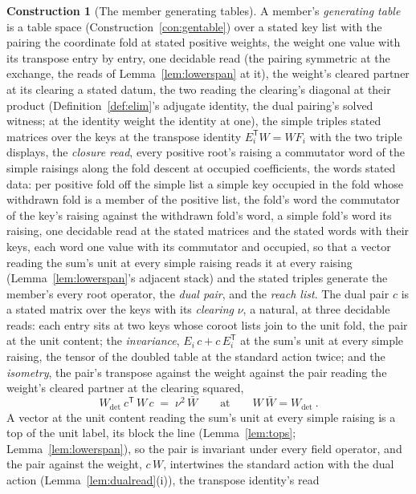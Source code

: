 \documentclass[11pt]{article}
\theoremstyle{definition}
\newtheorem{construction}{Construction}
\begin{document}
\begin{construction}[The member generating tables]\label{con:memtable}
A member's \emph{generating table}
is a table space (Construction~\ref{con:gentable}) over a stated
key list with the pairing the coordinate fold at stated positive
weights, the weight one value with its transpose entry by entry,
one decidable read (the pairing symmetric at the exchange, the
reads of Lemma~\ref{lem:lowerspan} at it), the weight's cleared
partner at its clearing a stated datum, the two reading the
clearing's diagonal at their product
(Definition~\ref{def:elim}'s adjugate identity, the dual pairing's
solved witness; at the identity weight the identity at one), the
simple triples stated matrices over the keys at the
transpose identity $E_i^{\mathsf T}W=WF_i$ with the two triple
displays, the \emph{closure read}, every positive root's raising a
commutator word of the simple raisings along the fold descent at
occupied coefficients, the words stated data: per positive fold
off the simple list a simple key occupied in the fold whose
withdrawn fold is a member of the positive list, the fold's word
the commutator of the key's raising against the withdrawn fold's
word, a simple fold's word its raising, one decidable read at the
stated matrices and the stated words with their keys, each word one
value with its commutator and occupied,
so that a vector reading the sum's unit at every simple raising
reads it at every raising (Lemma~\ref{lem:lowerspan}'s adjacent
stack) and the stated triples generate the member's every root
operator, the \emph{dual pair}, and the \emph{reach list}. The
dual pair $c$ is a stated matrix over the keys with its
\emph{clearing} $\nu$, a natural, at three decidable reads: each
entry sits at two keys whose coroot lists join to the unit fold,
the pair at the unit content; the \emph{invariance},
$E_i\,c+c\,E_i^{\mathsf T}$ at the sum's unit at every simple
raising, the tensor of the doubled table at the standard action
twice; and the \emph{isometry}, the pair's transpose against the
weight against the pair reading the weight's cleared partner at
the clearing squared,
\[
W_{\det}\ c^{\mathsf T}\,W\,c\;=\;\nu^{2}\,\bar W
\qquad\text{at}\qquad W\,\bar W=W_{\det}\ .
\]
A vector at the unit content reading the sum's unit at every
simple raising is a top of the unit label, its block the line
(Lemma~\ref{lem:tops}; Lemma~\ref{lem:lowerspan}), so the pair is
invariant under every field operator, and the pair against the
weight, $c\,W$, intertwines the standard action with the dual
action (Lemma~\ref{lem:dualread}(i)), the transpose identity's read

\end{construction}
\end{document}
